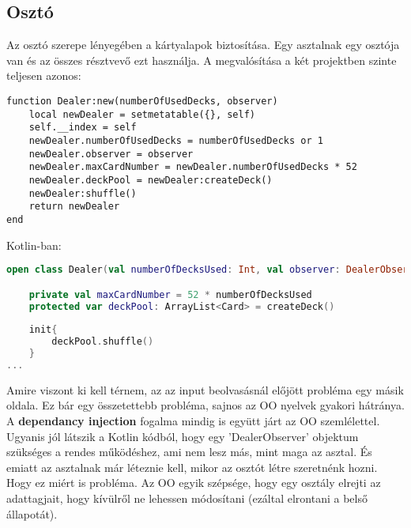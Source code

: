 \subsection{Osztó}
Az osztó szerepe lényegében a kártyalapok biztosítása. Egy asztalnak egy osztója van és az összes résztvevő ezt használja. A megvalósítása a két projektben szinte teljesen azonos:
\scriptsize
\begin{lstlisting}[style=Lua]
function Dealer:new(numberOfUsedDecks, observer)
	local newDealer = setmetatable({}, self)
	self.__index = self
	newDealer.numberOfUsedDecks = numberOfUsedDecks or 1
	newDealer.observer = observer
	newDealer.maxCardNumber = newDealer.numberOfUsedDecks * 52
	newDealer.deckPool = newDealer:createDeck()
	newDealer:shuffle()
	return newDealer
end
\end{lstlisting}
\normalsize
Kotlin-ban:
\scriptsize
\begin{lstlisting}[language = Kotlin]
open class Dealer(val numberOfDecksUsed: Int, val observer: DealerObserver) {

	private val maxCardNumber = 52 * numberOfDecksUsed
	protected var deckPool: ArrayList<Card> = createDeck()
	
	init{
		deckPool.shuffle()
	}
...
\end{lstlisting}
\normalsize
Amire viszont ki kell térnem, az az input beolvasásnál előjött probléma egy másik oldala. Ez bár egy összetettebb probléma, sajnos az OO nyelvek gyakori hátránya. A \textbf{dependancy injection} fogalma mindig is együtt járt az OO szemlélettel. Ugyanis jól látszik a Kotlin kódból, hogy egy 'DealerObserver' objektum szükséges a rendes működéshez, ami nem lesz más, mint maga az asztal. És emiatt az asztalnak már léteznie kell, mikor az osztót létre szeretnénk hozni. Hogy ez miért is probléma. Az OO egyik szépsége, hogy egy osztály elrejti az adattagjait, hogy kívülről ne lehessen módosítani (ezáltal elrontani a belső állapotát). 

\newpage

